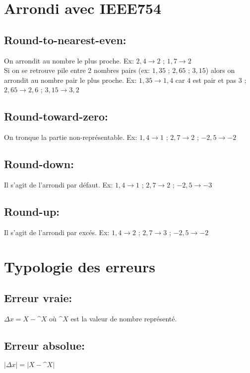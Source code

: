 \documentclass[11pt]{article}
\begin{document}
\section{Arrondi avec IEEE754}

\subsection{Round-to-nearest-even:}
On arrondit au nombre le plus proche. Ex: $2,4 \rightarrow 2$ ; $1,7 \rightarrow 2$ \\
Si on se retrouve pile entre 2 nombres pairs (ex: $1,35$ ; $2,65$ ; $3,15$) alors on arrondit au nombre pair le plus proche. Ex: $1,35 \rightarrow 1,4$ car $4$ est pair et pas $3$ ; 
$2,65 \rightarrow 2,6$ ; $3,15 \rightarrow 3,2$

\subsection{Round-toward-zero:}
On tronque la partie non-représentable. Ex: $1,4 \rightarrow 1$ ; $2,7 \rightarrow 2$ ; $-2,5 \rightarrow -2$

\subsection{Round-down:}
Il s'agit de l'arrondi par défaut. Ex: $1,4 \rightarrow 1$ ; $2,7 \rightarrow 2$ ; $-2,5 \rightarrow -3$

\subsection{Round-up:}
Il s'agit de l'arrondi par excés. Ex: $1,4 \rightarrow 2$ ; $2,7 \rightarrow 3$ ; $-2,5 \rightarrow -2$

\newpage

\section{Typologie des erreurs}

\subsection{Erreur vraie:}
$\Delta x = X - \^X$ où $\^X$ est la valeur de nombre représenté.

\subsection{Erreur absolue:}
$|\Delta x| = |X - \^X|$
\end{document}
